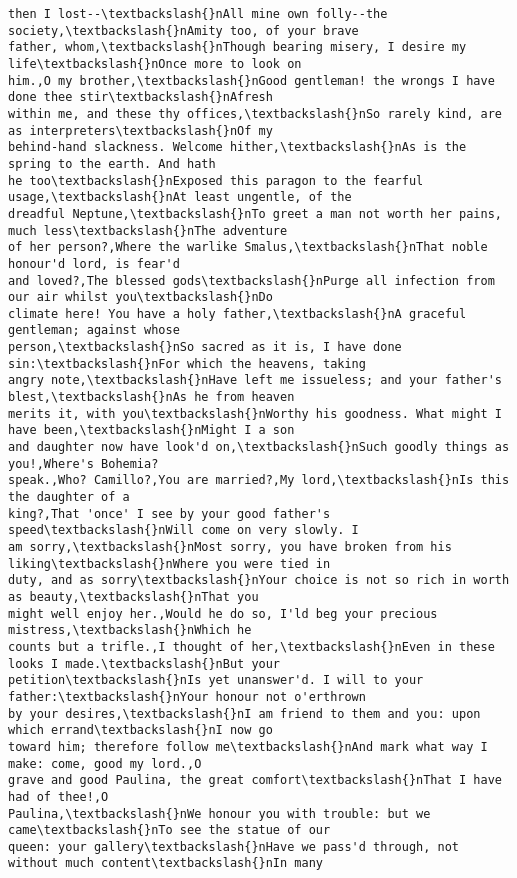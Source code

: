 \documentclass[11pt]{article}
\begin{document}
\begin{tcolorbox}[breakable, size=fbox, boxrule=.5pt, pad at break*=1mm, opacityfill=0]
\begin{Verbatim}[commandchars=\\\{\}]
then I lost--\textbackslash{}nAll mine own folly--the society,\textbackslash{}nAmity too, of your brave
father, whom,\textbackslash{}nThough bearing misery, I desire my life\textbackslash{}nOnce more to look on
him.,O my brother,\textbackslash{}nGood gentleman! the wrongs I have done thee stir\textbackslash{}nAfresh
within me, and these thy offices,\textbackslash{}nSo rarely kind, are as interpreters\textbackslash{}nOf my
behind-hand slackness. Welcome hither,\textbackslash{}nAs is the spring to the earth. And hath
he too\textbackslash{}nExposed this paragon to the fearful usage,\textbackslash{}nAt least ungentle, of the
dreadful Neptune,\textbackslash{}nTo greet a man not worth her pains, much less\textbackslash{}nThe adventure
of her person?,Where the warlike Smalus,\textbackslash{}nThat noble honour'd lord, is fear'd
and loved?,The blessed gods\textbackslash{}nPurge all infection from our air whilst you\textbackslash{}nDo
climate here! You have a holy father,\textbackslash{}nA graceful gentleman; against whose
person,\textbackslash{}nSo sacred as it is, I have done sin:\textbackslash{}nFor which the heavens, taking
angry note,\textbackslash{}nHave left me issueless; and your father's blest,\textbackslash{}nAs he from heaven
merits it, with you\textbackslash{}nWorthy his goodness. What might I have been,\textbackslash{}nMight I a son
and daughter now have look'd on,\textbackslash{}nSuch goodly things as you!,Where's Bohemia?
speak.,Who? Camillo?,You are married?,My lord,\textbackslash{}nIs this the daughter of a
king?,That 'once' I see by your good father's speed\textbackslash{}nWill come on very slowly. I
am sorry,\textbackslash{}nMost sorry, you have broken from his liking\textbackslash{}nWhere you were tied in
duty, and as sorry\textbackslash{}nYour choice is not so rich in worth as beauty,\textbackslash{}nThat you
might well enjoy her.,Would he do so, I'ld beg your precious mistress,\textbackslash{}nWhich he
counts but a trifle.,I thought of her,\textbackslash{}nEven in these looks I made.\textbackslash{}nBut your
petition\textbackslash{}nIs yet unanswer'd. I will to your father:\textbackslash{}nYour honour not o'erthrown
by your desires,\textbackslash{}nI am friend to them and you: upon which errand\textbackslash{}nI now go
toward him; therefore follow me\textbackslash{}nAnd mark what way I make: come, good my lord.,O
grave and good Paulina, the great comfort\textbackslash{}nThat I have had of thee!,O
Paulina,\textbackslash{}nWe honour you with trouble: but we came\textbackslash{}nTo see the statue of our
queen: your gallery\textbackslash{}nHave we pass'd through, not without much content\textbackslash{}nIn many

\end{Verbatim}
\end{tcolorbox}
\end{document}
